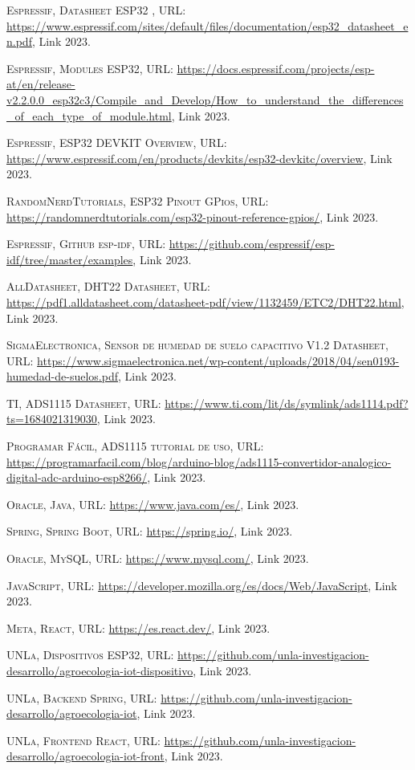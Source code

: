 \begin{thebibliography}{X}
 \textsc{Espressif}, \textsc{Datasheet ESP32} ,  URL: \url{https://www.espressif.com/sites/default/files/documentation/esp32_datasheet_en.pdf}, Link 2023.

 \textsc{Espressif}, \textsc{Modules ESP32},  URL: \url{https://docs.espressif.com/projects/esp-at/en/release-v2.2.0.0_esp32c3/Compile_and_Develop/How_to_understand_the_differences_of_each_type_of_module.html}, Link 2023.

 \textsc{Espressif}, \textsc{ESP32 DEVKIT Overview},  URL: \url{https://www.espressif.com/en/products/devkits/esp32-devkitc/overview}, Link 2023.

 \textsc{RandomNerdTutorials}, \textsc{ESP32 Pinout GPios}, URL: \url{https://randomnerdtutorials.com/esp32-pinout-reference-gpios/}, Link 2023.

 \textsc{Espressif}, \textsc{Github esp-idf},  URL: \url{https://github.com/espressif/esp-idf/tree/master/examples}, Link 2023.

 \textsc{AllDatasheet}, \textsc{DHT22 Datasheet},  URL: \url{https://pdf1.alldatasheet.com/datasheet-pdf/view/1132459/ETC2/DHT22.html}, Link 2023.

 \textsc{SigmaElectronica}, \textsc{Sensor de humedad de suelo capacitivo V1.2 Datasheet},  URL: \url{https://www.sigmaelectronica.net/wp-content/uploads/2018/04/sen0193-humedad-de-suelos.pdf}, Link 2023.

 \textsc{TI}, \textsc{ADS1115 Datasheet},  URL: \url{https://www.ti.com/lit/ds/symlink/ads1114.pdf?ts=1684021319030}, Link 2023.

 \textsc{Programar Fácil}, \textsc{ADS1115 tutorial de uso},  URL: \url{https://programarfacil.com/blog/arduino-blog/ads1115-convertidor-analogico-digital-adc-arduino-esp8266/}, Link 2023.

 \textsc{Oracle}, \textsc{Java},  URL: \url{https://www.java.com/es/}, Link 2023.

 \textsc{Spring}, \textsc{Spring Boot},  URL: \url{https://spring.io/}, Link 2023.

 \textsc{Oracle}, \textsc{MySQL},  URL: \url{https://www.mysql.com/}, Link 2023.

 \textsc{JavaScript},  URL: \url{https://developer.mozilla.org/es/docs/Web/JavaScript}, Link 2023.

 \textsc{Meta}, \textsc{React},  URL: \url{https://es.react.dev/}, Link 2023.

 \textsc{UNLa}, \textsc{Dispositivos ESP32},  URL: \url{https://github.com/unla-investigacion-desarrollo/agroecologia-iot-dispositivo}, Link 2023.

 \textsc{UNLa}, \textsc{Backend Spring},  URL: \url{https://github.com/unla-investigacion-desarrollo/agroecologia-iot}, Link 2023.

 \textsc{UNLa}, \textsc{Frontend React},  URL: \url{https://github.com/unla-investigacion-desarrollo/agroecologia-iot-front}, Link 2023.

\end{thebibliography}